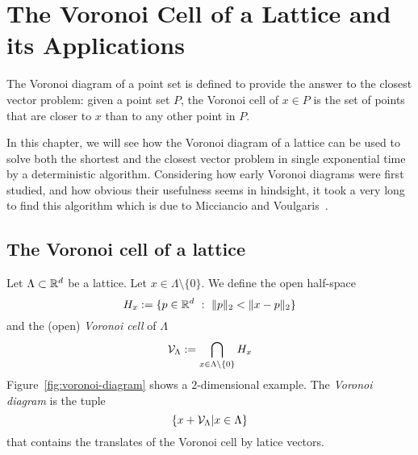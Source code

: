 %
%
%

\chapter{The Voronoi Cell of a Lattice and its Applications}
\label{chapter:voronoi-cell}

The Voronoi diagram of a point set is defined
to provide the answer to the closest vector problem:
given a point set $P$,
the Voronoi cell of $x \in P$ is the set of points
that are closer to $x$ than to any other point in $P$.

In this chapter, we will see how the Voronoi diagram of a lattice
can be used to solve both the shortest and the closest vector problem
in single exponential time by a deterministic algorithm.
Considering how early Voronoi diagrams were first studied,
and how obvious their usefulness seems in hindsight,
it took a very long to find this algorithm
which is due to Micciancio and Voulgaris~\cite{MR2743283}.


\section{The Voronoi cell of a lattice}

\begin{definition}
  Let $\Lambda \subset \mathbb{R}^d$ be a lattice.
  Let $x \in \Lambda \setminus \{ 0 \}$.
  We define the open half-space
  \[
    H_x := \{ p \in \mathbb{R}^d ~:~ \|p\|_2 < \|x-p\|_2 \}
  \]
  and the (open) \emph{Voronoi cell} of $\Lambda$
  \[
    \mathcal{V}_\Lambda := \bigcap_{x \in \Lambda\setminus\{0\}} H_x
  \]
  Figure~\ref{fig:voronoi-diagram} shows a $2$-dimensional example.
  The \emph{Voronoi diagram} is the tuple
  \[
    \{x + \mathcal{V}_\Lambda | x \in \Lambda\}
  \]
  that contains the translates of the Voronoi cell by latice vectors.
\end{definition}

